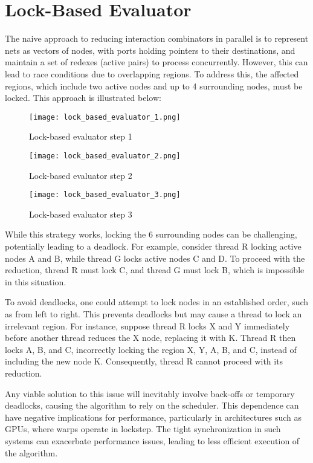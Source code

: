 \documentclass{article}
\begin{document}
\section{Lock-Based Evaluator}\label{s:lockfree}

The naive approach to reducing interaction combinators in parallel is to represent nets as vectors of nodes, with ports holding pointers to their destinations, and maintain a set of redexes (active pairs) to process concurrently. However, this can lead to race conditions due to overlapping regions. To address this, the affected regions, which include two active nodes and up to 4 surrounding nodes, must be locked. This approach is illustrated below:

\begin{figure}[h!]
\centering
\texttt{[image: lock\_based\_evaluator\_1.png]}
\caption{Lock-based evaluator step 1}
\end{figure}

\begin{figure}[h!]
\centering
\texttt{[image: lock\_based\_evaluator\_2.png]}
\caption{Lock-based evaluator step 2}
\end{figure}

\begin{figure}[h!]
\centering
\texttt{[image: lock\_based\_evaluator\_3.png]}
\caption{Lock-based evaluator step 3}
\end{figure}

While this strategy works, locking the 6 surrounding nodes can be challenging, potentially leading to a deadlock. For example, consider thread R locking active nodes A and B, while thread G locks active nodes C and D. To proceed with the reduction, thread R must lock C, and thread G must lock B, which is impossible in this situation.

To avoid deadlocks, one could attempt to lock nodes in an established order, such as from left to right. This prevents deadlocks but may cause a thread to lock an irrelevant region. For instance, suppose thread R locks X and Y immediately before another thread reduces the X node, replacing it with K. Thread R then locks A, B, and C, incorrectly locking the region X, Y, A, B, and C, instead of including the new node K. Consequently, thread R cannot proceed with its reduction.

Any viable solution to this issue will inevitably involve back-offs or temporary deadlocks, causing the algorithm to rely on the scheduler. This dependence can have negative implications for performance, particularly in architectures such as GPUs, where warps operate in lockstep. The tight synchronization in such systems can exacerbate performance issues, leading to less efficient execution of the algorithm.
\end{document}
